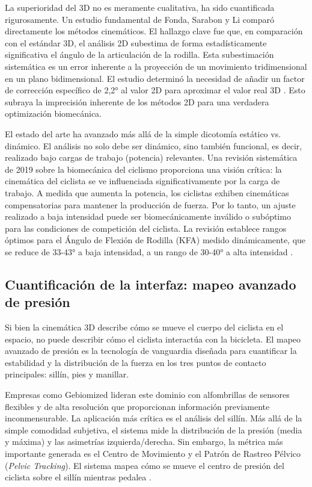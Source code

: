 La superioridad del 3D no es meramente cualitativa, ha sido cuantificada
rigurosamente. Un estudio fundamental de Fonda, Sarabon y Li \citep{fonda2013validity} comparó
directamente los métodos cinemáticos. El hallazgo clave fue que, en comparación
con el estándar 3D, el análisis 2D subestima de forma estadísticamente
significativa el ángulo de la articulación de la rodilla. Esta subestimación
sistemática es un error inherente a la proyección de un movimiento
tridimensional en un plano bidimensional. El estudio determinó la necesidad de
añadir un factor de corrección específico de 2,2° al valor 2D para aproximar el
valor real 3D \citep{fonda2013validity}. Esto subraya la imprecisión inherente
de los métodos 2D para una verdadera optimización biomecánica.

El estado del arte ha avanzado más allá de la simple dicotomía estático vs.
dinámico. El análisis no solo debe ser dinámico, sino también funcional, es
decir, realizado bajo cargas de trabajo (potencia) relevantes. Una revisión
sistemática de 2019 \citep{review2019cycling} sobre la biomecánica del ciclismo proporciona una visión
crítica: la cinemática del ciclista se ve influenciada significativamente por
la carga de trabajo. A medida que aumenta la potencia, los ciclistas exhiben
cinemáticas compensatorias para mantener la producción de fuerza. Por lo tanto,
un ajuste realizado a baja intensidad puede ser biomecánicamente inválido o
subóptimo para las condiciones de competición del ciclista. La revisión
establece rangos óptimos para el Ángulo de Flexión de Rodilla (KFA) medido
dinámicamente, que se reduce de 33-43° a baja intensidad, a un rango de 30-40°
a alta intensidad \citep{review2019cycling}.

\subsection{Cuantificación de la interfaz: mapeo avanzado de presión}

Si bien la cinemática 3D describe cómo se mueve el cuerpo del ciclista en el
espacio, no puede describir cómo el ciclista interactúa con la bicicleta. El
mapeo avanzado de presión \citep{IACenter2025} es la tecnología de vanguardia diseñada para
cuantificar la estabilidad y la distribución de la fuerza en los tres puntos de
contacto principales: sillín, pies y manillar.

Empresas como Gebiomized \citep{gebiomized:web} lideran este dominio con alfombrillas de sensores
flexibles y de alta resolución que proporcionan información previamente
inconmensurable. La aplicación más crítica es el análisis del sillín. Más allá
de la simple comodidad subjetiva, el sistema mide la distribución de la presión
(media y máxima) y las asimetrías izquierda/derecha. Sin embargo, la métrica
más importante generada es el Centro de Movimiento y el Patrón de Rastreo
Pélvico (\textit{Pelvic Tracking}). El sistema mapea cómo se mueve el centro de
presión del ciclista sobre el sillín mientras pedalea \citep{gebiomized:web}.

